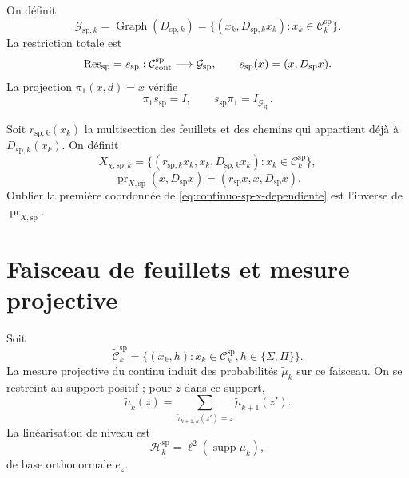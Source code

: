 On définit
\begin{equation}
\label{eq:continuo-sp-g-graph}
 \mathcal G_{\mathrm{sp},k}
 =\operatorname{Graph}(D_{\mathrm{sp},k})
 =\{(x_k,D_{\mathrm{sp},k}x_k):
     x_k\in\mathcal C_k^{\mathrm{sp}}\}.
\end{equation}
La restriction totale est
\begin{equation}
\label{eq:continuo-sp-res-graph}
 \operatorname{Res}_{\mathrm{sp}}=s_{\mathrm{sp}}:
 \mathcal C_{\rm cont}^{\mathrm{sp}}
 \longrightarrow\mathcal G_{\mathrm{sp}},
 \qquad
 s_{\mathrm{sp}}(x)=(x,D_{\mathrm{sp}}x).
\end{equation}
La projection \(\pi_1(x,d)=x\) vérifie
\begin{equation}
\label{eq:continuo-sp-res-inversa}
 \pi_1s_{\mathrm{sp}}=I,
 \qquad
 s_{\mathrm{sp}}\pi_1=I_{\mathcal G_{\mathrm{sp}}}.
\end{equation}

Soit \(r_{\mathrm{sp},k}(x_k)\) la multisection des feuillets et des chemins qui appartient
déjà à \(D_{\mathrm{sp},k}(x_k)\). On définit
\begin{equation}
\label{eq:continuo-sp-x-dependiente}
 X_{\chi,\mathrm{sp},k}
 =\{(r_{\mathrm{sp},k}x_k,x_k,D_{\mathrm{sp},k}x_k):
     x_k\in\mathcal C_k^{\mathrm{sp}}\},
\end{equation}
\begin{equation}
\label{eq:continuo-sp-pr-x}
 \operatorname{pr}_{X,\mathrm{sp}}(x,D_{\mathrm{sp}}x)
 =(r_{\mathrm{sp}}x,x,D_{\mathrm{sp}}x).
\end{equation}
Oublier la première coordonnée de
\eqref{eq:continuo-sp-x-dependiente} est l'inverse de
\(\operatorname{pr}_{X,\mathrm{sp}}\).

\section{Faisceau de feuillets et mesure projective}

Soit
\begin{equation}
\label{eq:continuo-sp-haz-hojas}
 \widetilde{\mathcal C}_k^{\mathrm{sp}}
 =\{(x_k,h):x_k\in\mathcal C_k^{\mathrm{sp}},
              h\in\{\Sigma,\Pi\}\}.
\end{equation}
La mesure projective du continu induit des probabilités
\(\widetilde\mu_k\) sur ce faisceau. On se restreint au support positif ; pour
\(z\) dans ce support,
\begin{equation}
\label{eq:continuo-sp-consistencia-medida}
 \widetilde\mu_k(z)
 =\sum_{\widetilde\tau_{k+1,k}(z')=z}
  \widetilde\mu_{k+1}(z').
\end{equation}
La linéarisation de niveau est
\begin{equation}
\label{eq:continuo-sp-hilbert-nivel}
 \mathcal H_k^{\mathrm{sp}}
 =\ell^2(\operatorname{supp}\widetilde\mu_k),
\end{equation}
de base orthonormale \(e_z\).

